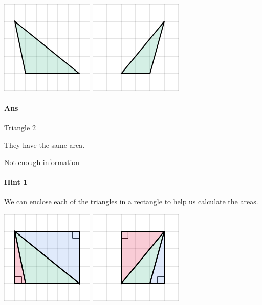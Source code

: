 \documentclass[twocolumn,10pt]{article}
\def\shrinkfactor{0.55}
\begin{document}
\includegraphics[scale=\shrinkfactor]{figures/dd6e582868d2bc3d35ca3f329428a4681201dfe1.png} 
\includegraphics[scale=\shrinkfactor]{figures/dc0e8470e25253d17fd6faaff4da3897941fe7e9.png}

\paragraph{Ans} 


 Triangle $2$

They have the same area.

Not enough information



\paragraph{Hint 1}We can enclose each of the triangles in a rectangle to help us calculate the areas.  

\includegraphics[scale=\shrinkfactor]{figures/654fe9a0a38e5306d6be147e41867389bd058f2d.png} 
\includegraphics[scale=\shrinkfactor]{figures/dec5586c9571e1ad5901d4114bd844888463acb4.png}
\end{document}
